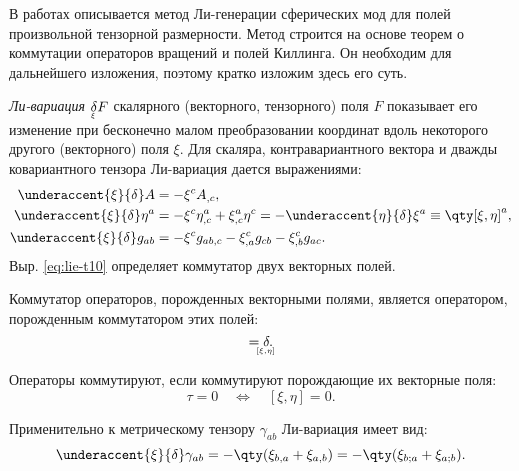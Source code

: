 \documentclass[\docroot/reports/draft/report.tex]{subfiles}
\begin{document}
\label{sec:killing}

    В работах \cite{burlankov_tmf,burlankov_grav_waves} описывается метод Ли-генерации сферических мод для полей произвольной тензорной размерности. Метод строится на основе теорем о коммутации операторов вращений и полей Киллинга. Он необходим для дальнейшего изложения, поэтому кратко изложим здесь его суть.

    \textit{Ли-вариация} $\underaccent{\xi}{\delta} F$ скалярного (векторного, тензорного) поля $F$ показывает его изменение при бесконечно малом преобразовании координат вдоль некоторого другого (векторного) поля $\xi$. Для скаляра, контравариантного вектора и дважды ковариантного тензора Ли-вариация дается выражениями:
    \begin{align}\label{eq:lie-t00}
        \underaccent{\xi}{\delta} A &= - \xi^c A_{,c}, \\
        \label{eq:lie-t10}
        \underaccent{\xi}{\delta} \eta^a &=
            - \xi^c \eta^{a}_{,c} + \xi^a_{,c} \eta^c =
                - \underaccent{\eta}{\delta} \xi^a \equiv \qty[\xi,\eta]^a, \\
        \label{eq:lie-t02}
        \underaccent{\xi}{\delta} g_{ab} &=
            - \xi^c g_{ab,c} - \xi^c_{,a} g_{cb} - \xi^c_{,b} g_{ac}.
    \end{align}
    Выр. \ref{eq:lie-t10} определяет коммутатор двух векторных полей.
    \begin{theorem}
        Коммутатор операторов, порожденных векторными полями, является оператором, порожденным коммутатором этих полей:
        \begin{equation*}
            [\underaccent{\xi}{\delta},\underaccent{\eta}{\delta}] =
                \underaccent{[\xi,\eta]}{\delta}.
        \end{equation*}
    \end{theorem}
    \begin{theorem}
        Операторы коммутируют, если коммутируют порождающие их векторные поля:
        \begin{equation*}
            [\underaccent{\xi}{\delta},\underaccent{\eta}{\delta}]\tau = 0
                \quad\Leftrightarrow\quad
            [\xi,\eta] = 0 .
        \end{equation*}
    \end{theorem}

    Применительно к метрическому тензору $\gamma_{ab}$ Ли-вариация имеет вид:
    \begin{equation}\label{eq:lie-tm}
        \underaccent{\xi}{\delta} \gamma_{ab}
            = - \qty(\xi_{b,a} + \xi_{a,b})
            = - \qty(\xi_{b;a} + \xi_{a;b}).
    \end{equation}
\end{document}
